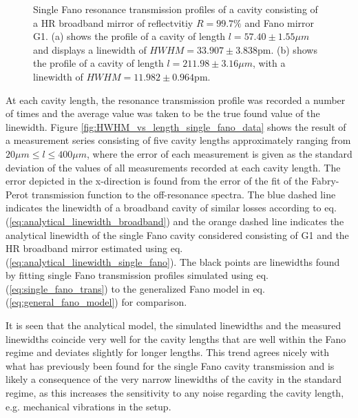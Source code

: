 \begin{figure}[h!]
\begin{subfigure}[b]{0.49\textwidth}
        \caption{}
        \label{fig:long_single_fano_trans}
    \end{subfigure}
    \caption{Single Fano resonance transmission profiles of a cavity consisting of a HR broadband mirror of reflectvitiy $R=99.7\%$ and Fano mirror G1. (a) shows the profile of a cavity of length $l = 57.40 \pm 1.55 \mu m$ and displays a linewidth of $HWHM = 33.907 \pm 3.838$pm. (b) shows the profile of a cavity of length $l = 211.98 \pm 3.16 \mu m$, with a linewidth of $HWHM = 11.982 \pm 0.964$pm.}
    \label{fig:M5/G1_single_fano_trans_examples}
\end{figure}

At each cavity length, the resonance transmission profile was recorded a number of times and the average value was taken to be the true found value of the linewidth. Figure \ref{fig:HWHM_vs_length_single_fano_data} shows the result of a measurement series consisting of five cavity lengths approximately ranging from $20\mu m \leq l \leq 400 \mu m$, where the error of each measurement is given as the standard deviation of the values of all measurements recorded at each cavity length\cite{Hughes}. The error depicted in the x-direction is found from the error of the fit of the Fabry-Perot transmission function to the off-resonance spectra. The blue dashed line indicates the linewidth of a broadband cavity of similar losses according to eq. (\ref{eq:analytical_linewidth_broadband}) and the orange dashed line indicates the analytical linewidth of the single Fano cavity considered consisting of G1 and the HR broadband mirror estimated using eq. (\ref{eq:analytical_linewidth_single_fano}). The black points are linewidths found by fitting single Fano transmission profiles simulated using eq. (\ref{eq:single_fano_trans}) to the generalized Fano model in eq. (\ref{eq:general_fano_model}) for comparison. 

It is seen that the analytical model, the simulated linewidths and the measured linewidths coincide very well for the cavity lengths that are well within the Fano regime and deviates slightly for longer lengths. This trend agrees nicely with what has previously been found for the single Fano cavity transmission\cite{Mitra} and is likely a consequence of the very narrow linewidths of the cavity in the standard regime, as this increases the sensitivity to any noise regarding the cavity length, e.g. mechanical vibrations in the setup.

